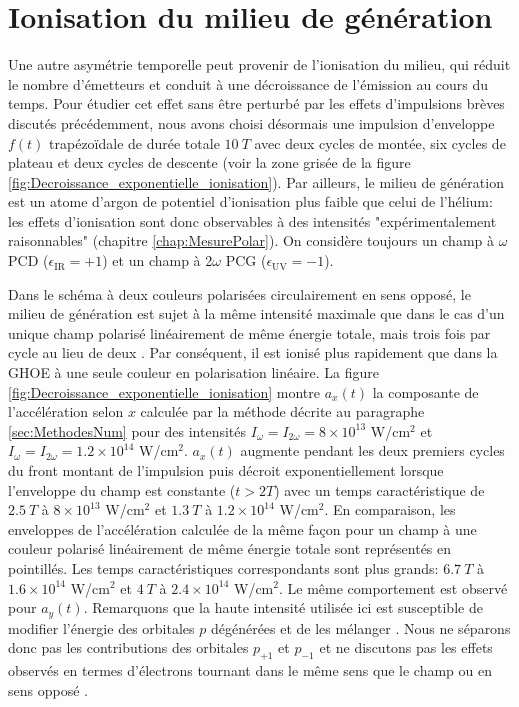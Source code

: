 \section{Ionisation du milieu de génération}
\label{sec:Ionisation}
Une autre asymétrie temporelle peut provenir de l'ionisation du milieu, qui réduit le nombre d'émetteurs et conduit à une décroissance de l'émission au cours du temps. Pour étudier cet effet sans être perturbé par les effets d'impulsions brèves discutés précédemment, nous avons choisi désormais une impulsion d'enveloppe $f(t)$ trapézoïdale de durée totale $10 \: T$ avec deux cycles de montée, six cycles de plateau et deux cycles de descente (voir la zone grisée de la figure \ref{fig:Decroissance_exponentielle_ionisation}). Par ailleurs, le milieu de génération est un atome d'argon de potentiel d'ionisation plus faible que celui de l'hélium: les effets d'ionisation sont donc observables à des intensités "expérimentalement raisonnables" (chapitre \ref{chap:MesurePolar}). On considère toujours un champ à $\omega$ PCD ($\epsilon_{\text{IR}} = +1$) et un champ à 2$\omega$ PCG ($\epsilon_{\text{UV}} = -1$).

Dans le schéma à deux couleurs polarisées circulairement en sens opposé, le milieu de génération est sujet à la même intensité maximale que dans le cas d'un unique champ polarisé linéairement de  même énergie totale, mais trois fois par cycle au lieu de deux . Par conséquent, il est ionisé plus rapidement que dans la GHOE à une seule couleur en polarisation linéaire. La figure \ref{fig:Decroissance_exponentielle_ionisation} montre $a_x(t)$ la composante de l'accélération selon $x$ calculée par la méthode décrite au paragraphe \ref{sec:MethodesNum} pour des intensités $I_\omega = I_{2\omega} = 8 \times 10^{13}$ W/cm$^2$ et $I_\omega = I_{2\omega} = 1.2 \times 10^{14}$ W/cm$^2$. $a_x(t)$ augmente pendant les deux premiers cycles du front montant de l'impulsion puis décroit exponentiellement lorsque l'enveloppe du champ est constante ($t > 2T$) avec un temps caractéristique de $2.5 \: T$ à $8 \times 10^{13}$ W/cm$^2$ et $1.3 \: T$ à $1.2 \times 10^{14}$ W/cm$^2$. En comparaison, les enveloppes de l'accélération calculée de la même façon pour un champ à une couleur polarisé linéairement de même énergie totale sont représentés en pointillés. Les temps caractéristiques correspondants sont plus grands: $6.7 \: T$ à $1.6 \times 10^{14}$ W/cm$^2$ et $4 \: T$ à $2.4 \times 10^{14}$ W/cm$^2$. Le même comportement est observé pour $a_y (t)$. Remarquons que la haute intensité utilisée ici est susceptible de modifier l'énergie des orbitales $p$ dégénérées et de les mélanger . Nous ne séparons donc pas les contributions des orbitales $p_{+1}$ et $p_{-1}$ et ne discutons pas les effets observés en termes d'électrons tournant dans le même sens que le champ ou en sens opposé .

